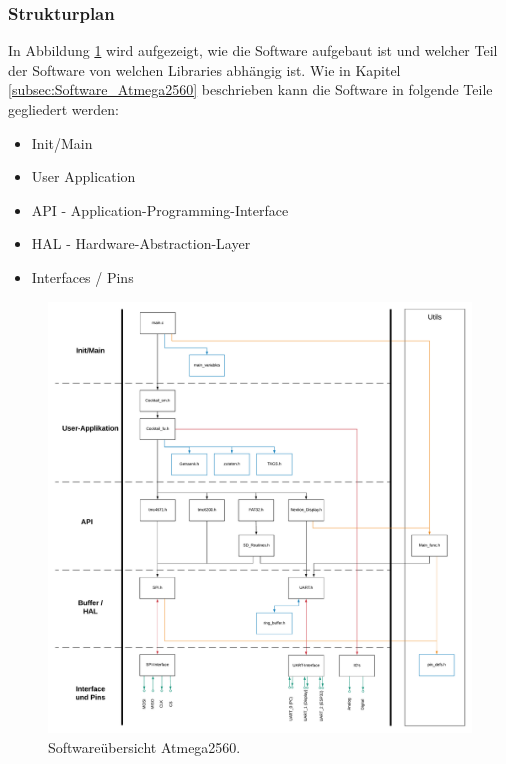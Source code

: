 \clearpage
\subsubsection{Strukturplan}
\label{subsubsec:Strukturplan_Atmega}

In Abbildung \ref{fig:Softwareuebersicht_Atmega2560} wird aufgezeigt, wie die Software aufgebaut ist und welcher Teil der Software von welchen Libraries abhängig ist. Wie in Kapitel \ref{subsec:Software_Atmega2560} beschrieben kann die Software in folgende Teile gegliedert werden:
\begin{itemize}
\item Init/Main
\item User Application
\item API - Application-Programming-Interface
\item HAL - Hardware-Abstraction-Layer
\item Interfaces / Pins
\end{itemize}

\begin{figure}[h!]
	\centering
	\includegraphics[width=\textwidth]{graphics/Softwareuebersicht.pdf}
	\caption{Softwareübersicht Atmega2560.}
	\label{fig:Softwareuebersicht_Atmega2560}
\end{figure}

